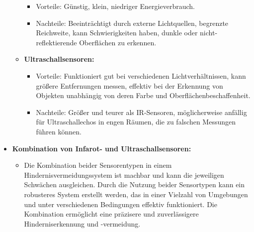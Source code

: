 \documentclass{vorlage-design-main}
\begin{document}
\begin{itemize}
\begin{itemize}
    \begin{itemize}
    
    \item
      Vorteile: Günstig, klein, niedriger Energieverbrauch.
    \item
      Nachteile: Beeinträchtigt durch externe Lichtquellen, begrenzte
      Reichweite, kann Schwierigkeiten haben, dunkle oder
      nicht-reflektierende Oberflächen zu erkennen.
    \end{itemize}
  \item
    \textbf{Ultraschallsensoren:}

    \begin{itemize}
    
    \item
      Vorteile: Funktioniert gut bei verschiedenen Lichtverhältnissen,
      kann größere Entfernungen messen, effektiv bei der Erkennung von
      Objekten unabhängig von deren Farbe und Oberflächenbeschaffenheit.
    \item
      Nachteile: Größer und teurer als IR-Sensoren, möglicherweise
      anfällig für Ultraschallechos in engen Räumen, die zu falschen
      Messungen führen können.
    \end{itemize}
  \end{itemize}
\item
  \textbf{Kombination von Infarot- und Ultraschallsensoren:}

  \begin{itemize}
  
  \item
    Die Kombination beider Sensorentypen in einem
    Hindernisvermeidungssystem ist machbar und kann die jeweiligen
    Schwächen ausgleichen. Durch die Nutzung beider Sensortypen kann ein
    robusteres System erstellt werden, das in einer Vielzahl von
    Umgebungen und unter verschiedenen Bedingungen effektiv
    funktioniert. Die Kombination ermöglicht eine präzisere und
    zuverlässigere Hinderniserkennung und -vermeidung.
  \end{itemize}
\end{itemize} %


\clearpage
\printbibliography
\end{document}

